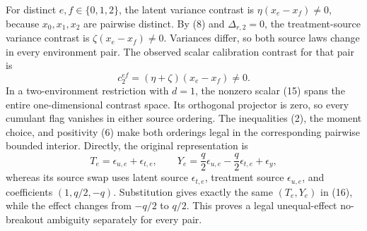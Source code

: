 For distinct \(e,f\in\{0,1,2\}\), the latent variance contrast is \(\eta(x_e-x_f)\neq0\), because \(x_0,x_1,x_2\) are pairwise distinct.  By (8) and \(\Delta_{r,2}=0\), the treatment-source variance contrast is \(\zeta(x_e-x_f)\neq0\).  Variances differ, so both source laws change in every environment pair.  The observed scalar calibration contrast for that pair is
\[
 c_2^{ef}=(\eta+\zeta)(x_e-x_f)\neq0.                                    \tag{15}
\]
In a two-environment restriction with \(d=1\), the nonzero scalar (15) spans the entire one-dimensional contrast space.  Its orthogonal projector is zero, so every cumulant flag vanishes in either source ordering.  The inequalities (2), the moment choice, and positivity (6) make both orderings legal in the corresponding pairwise bounded interior.  Directly, the original representation is
\[
 T_e=\epsilon_{u,e}+\epsilon_{t,e},
 \qquad
 Y_e=\frac q2\epsilon_{u,e}-\frac q2\epsilon_{t,e}+\epsilon_y,           \tag{16}
\]
whereas its source swap uses latent source \(\epsilon_{t,e}\), treatment source \(\epsilon_{u,e}\), and coefficients \((1,q/2,-q)\).  Substitution gives exactly the same \((T_e,Y_e)\) in (16), while the effect changes from \(-q/2\) to \(q/2\).  This proves a legal unequal-effect no-breakout ambiguity separately for every pair.

